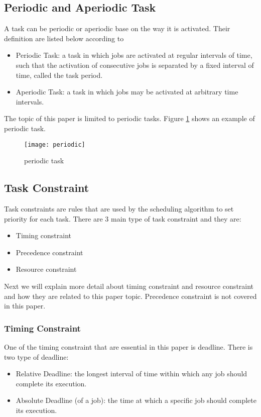 \subsection{Periodic and Aperiodic Task}

A task can be periodic or aperiodic base on the way it is activated. Their definition are listed below according to \cite{b4}
\begin{itemize}
\item Periodic Task: a task in which jobs are activated at regular intervals of time, such that the activation of consecutive jobs is separated by a fixed interval of time, called the task period.
\item Aperiodic Task: a task in which jobs may be activated at arbitrary time intervals.
\end{itemize}

The topic of this paper is limited to periodic tasks. Figure \ref{fig:periodic} shows an example of periodic task.

\begin{figure}[h]
    \centering
    \texttt{[image: periodic]}
    \caption{periodic task \cite{b5}}
    \label{fig:periodic}
\end{figure}

\subsection{Task Constraint}

Task constraints are rules that are used by the scheduling algorithm to set  priority for each task. There are 3 main type of task constraint and they are:

\begin{itemize}
\item Timing constraint
\item Precedence constraint
\item Resource constraint
\end{itemize}

Next we will explain more detail about timing constraint and resource constraint and how they are related to this paper topic. Precedence constraint is not covered in this paper. 

\subsubsection{Timing Constraint}

One of the timing constraint that are essential in this paper is deadline. There is two type of deadline:
\begin{itemize}
\item Relative Deadline: the longest interval of time within which any job should complete its execution\cite{b4}.
\item Absolute Deadline (of a job): the time at which a specific job should complete its execution\cite{b4}.
\end{itemize}

